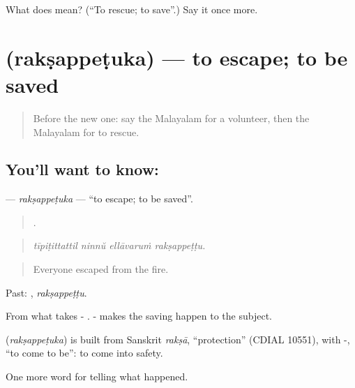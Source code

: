 \begin{tcolorbox}[breakable,colback=teal!4,colframe=teal!35!black,title={Before you move on}]
What does  mean? (\textquotedblleft{}To rescue; to save\textquotedblright{}.) Say it once more.
\end{tcolorbox}
\section[\texorpdfstring{\ml{രക്ഷപ്പെടുക} (rakṣappeṭuka)}{രക്ഷപ്പെടുക (rakṣappeṭuka)}]{ (rakṣappeṭuka) — to escape; to be saved}

\label{lesson:ML-C375-raksappetuka}



\begin{quote}
Before the new one: say the Malayalam for a volunteer, then the Malayalam for to rescue.
\end{quote}

\subsection*{You'll want to know: }
\textbf{} — \emph{rakṣappeṭuka} — \textquotedblleft{}to escape; to be saved\textquotedblright{}.

\begin{quote}
   .
\end{quote}

\begin{quote}
\emph{tīpiṭittattil ninnŭ ellāvaruṁ rakṣappeṭṭu.}
\end{quote}

\begin{quote}
Everyone escaped from the fire.
\end{quote}

Past: , \emph{rakṣappeṭṭu}.

From what takes - . - makes the saving happen to the subject.

\begin{cousinweb}
\textbf{} (\emph{rakṣappeṭuka}) is built from Sanskrit \emph{rakṣā}, \textquotedblleft{}protection\textquotedblright{} (CDIAL 10551), with -, \textquotedblleft{}to come to be\textquotedblright{}: to come into safety.
\end{cousinweb}

\begin{grammarlens}[title={What you've built}]
One more word for telling what happened.
\end{grammarlens}

